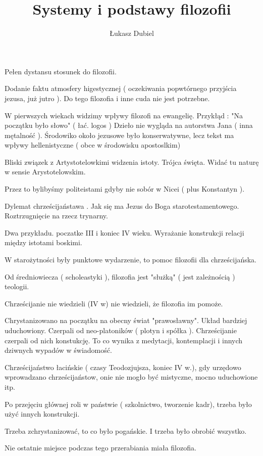 \documentclass[11pt]{article}
\author{Łukasz Dubiel}
\begin{document}
\title{Systemy i podstawy filozofii}

\maketitle

Pełen dystansu stosunek do filozofii. 

Dodanie faktu atmosfery higestycznej ( oczekiwania popwtórnego przyjścia jezusa, już jutro ).
Do tego filozofia i inne cuda nie jest potrzebne.

W pierwszych wiekach widzimy wpływy filozofi na ewangelię.
Przykłąd : "Na początku było słowo" ( łać. logos ) 
Dzieło nie wygląda na autorstwa Jana ( inna mętalność ). Środowiko około jezusowe było konserwatywne, lecz tekst ma wpływy hellenistyczne ( obce w środowisku apostoslkim)

Bliski związek z Artystotelowkimi widzenia istoty. Trójca święta. Widać tu naturę w sensie Arystotelowskim.

Przez to bylibyśmy politeistami gdyby nie sobór w Nicei ( plus Konstantyn ).

Dylemat chrześcijaństawa . Jak się ma Jezus do Boga starotestamentowego. Roztrzugnięcie na rzecz trynarny.

Dwa przykładu.
poczatke III i koniec IV wieku. Wyrażanie konstrukcji relacji między istotami boskimi.

W starożytności były punktowe wydarzenie, to pomoc filozofii dla chrześcijańska.

Od średniowiecza ( scholeastyki ), filozofia jest "służką" ( jest zależnością ) teologii. 

Chrześcijanie nie wiedzieli (IV w) nie wiedzieli, że filozofia im pomoże. 

Chrystanizowano na początku na obecny świat "prawosławny". Układ bardziej uduchowiony. Czerpali od neo-platoników ( plotyn i spółka ). Chrześcijanie czerpali od nich konstukcję. To co wynika z medytacji, kontemplacji i innych dziwnych wypadów w świadomość.

Chrześcijaństwo łacińskie ( czasy Teodozjujsza, koniec IV w.), gdy urzędowo wprowadzano chrześcijaństow, onie nie mogło być mistyczne, mocno uduchowione itp. 

Po przejęciu głównej roli w państwie ( szkolnictwo, tworzenie kadr), trzeba było użyć innych konstrukcji.

Trzeba zchrystanizować, to co było pogańskie. I trzeba było obrobić wszystko.

Nie ostatnie miejsce podczas tego przerabiania miała filozofia.
\end{document}
